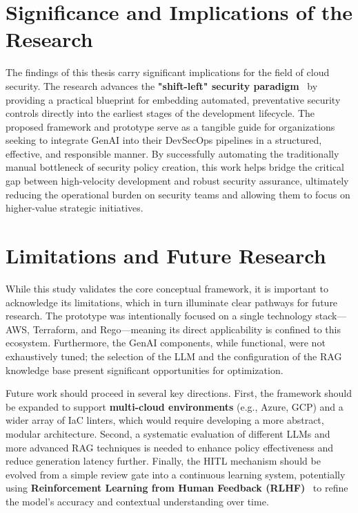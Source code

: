 \section{Significance and Implications of the Research}

The findings of this thesis carry significant implications for the field of cloud security. The research advances the \textbf{"shift-left" security paradigm}~\cite{Akto2025} by providing a practical blueprint for embedding automated, preventative security controls directly into the earliest stages of the development lifecycle. The proposed framework and prototype serve as a tangible guide for organizations seeking to integrate GenAI into their DevSecOps pipelines in a structured, effective, and responsible manner. By successfully automating the traditionally manual bottleneck of security policy creation, this work helps bridge the critical gap between high-velocity development and robust security assurance, ultimately reducing the operational burden on security teams and allowing them to focus on higher-value strategic initiatives.

\section{Limitations and Future Research}

While this study validates the core conceptual framework, it is important to acknowledge its limitations, which in turn illuminate clear pathways for future research. The prototype was intentionally focused on a single technology stack—AWS, Terraform, and Rego—meaning its direct applicability is confined to this ecosystem. Furthermore, the GenAI components, while functional, were not exhaustively tuned; the selection of the LLM and the configuration of the RAG knowledge base present significant opportunities for optimization.

Future work should proceed in several key directions. First, the framework should be expanded to support \textbf{multi-cloud environments} (e.g., Azure, GCP) and a wider array of IaC linters, which would require developing a more abstract, modular architecture. Second, a systematic evaluation of different LLMs and more advanced RAG techniques is needed to enhance policy effectiveness and reduce generation latency further. Finally, the HITL mechanism should be evolved from a simple review gate into a continuous learning system, potentially using \textbf{Reinforcement Learning from Human Feedback (RLHF)}~\cite{Ouyang2022} to refine the model's accuracy and contextual understanding over time.

